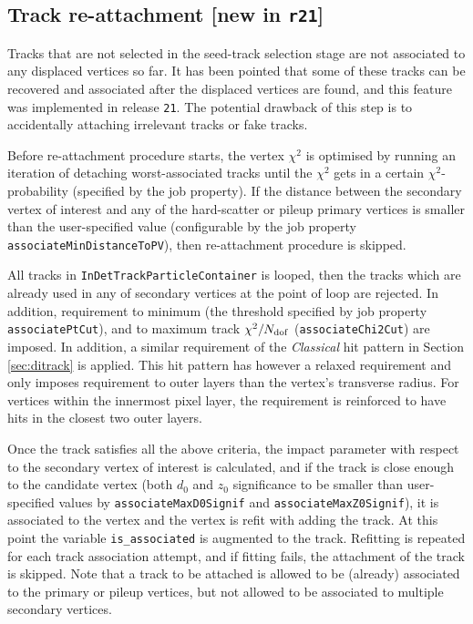 \documentclass[NOTE, atlasdraft=true, texlive=2018, UKenglish]{\ATLASLATEXPATH atlasdoc}
\begin{document}
\subsection{Track re-attachment [new in {\tt r21}]}
Tracks that are not selected in the seed-track selection stage are not associated to any displaced vertices so far. It has been pointed that some of these tracks can be recovered and associated after the displaced vertices are found, and this feature was implemented in release {\tt 21}. The potential drawback of this step is to accidentally attaching irrelevant tracks or fake tracks.

Before re-attachment procedure starts, the vertex $\chi^{2}$ is optimised by running an iteration of detaching worst-associated tracks until the $\chi^{2}$ gets in a certain $\chi^{2}$-probability (specified by the job property). If the distance between the secondary vertex of interest and any of the hard-scatter or pileup primary vertices is smaller than the user-specified value (configurable by the job property {\tt associateMinDistanceToPV}), then re-attachment procedure is skipped.

All tracks in {\tt InDetTrackParticleContainer} is looped, then the tracks which are already used in any of secondary vertices at the point of loop are rejected. In addition, requirement to minimum \pt (the threshold specified by job property {\tt associatePtCut}), and to maximum track $\chi^{2}/N_{\rm dof}$ ({\tt associateChi2Cut}) are imposed. In addition, a similar requirement of the \emph{Classical} hit pattern in Section \ref{sec:ditrack} is applied. This hit pattern has however a relaxed requirement and only imposes requirement to outer layers than the vertex's transverse radius. For vertices within the innermost pixel layer, the requirement is reinforced to have hits in the closest two outer layers.

Once the track satisfies all the above criteria, the impact parameter with respect to the secondary vertex of interest is calculated, and if the track is close enough to the candidate vertex (both $d_{0}$ and $z_{0}$ significance to be smaller than user-specified values by {\tt associateMaxD0Signif} and {\tt associateMaxZ0Signif}), it is associated to the vertex and the vertex is refit with adding the track. At this point the variable {\tt is\_associated} is augmented to the track. Refitting is repeated for each track association attempt, and if fitting fails, the attachment of the track is skipped. Note that a track to be attached is allowed to be (already) associated to the primary or pileup vertices, but not allowed to be associated to multiple secondary vertices.
\end{document}
